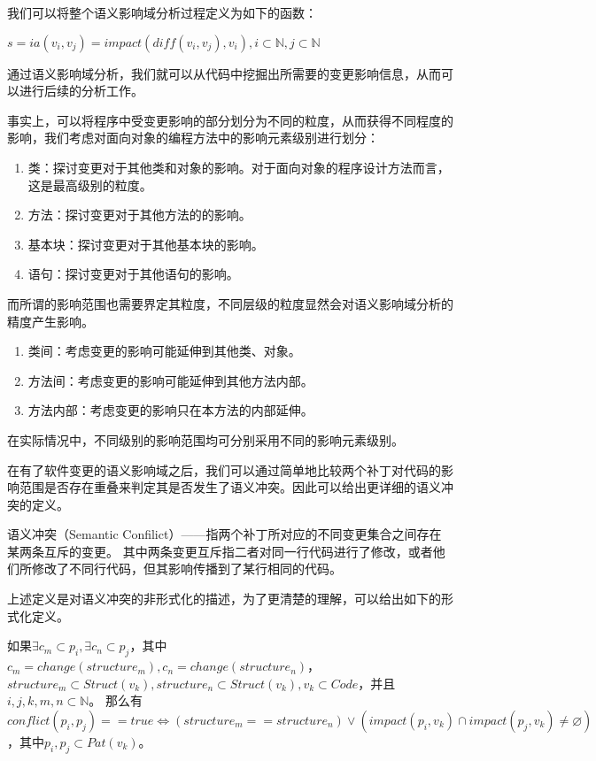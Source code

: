 我们可以将整个语义影响域分析过程定义为如下的函数：

\begin{definition}
	$s = ia(v_i,v_j) = impact(diff(v_i,v_j),v_i),i \subset \mathbb{N}, j \subset \mathbb{N}$
\end{definition}

通过语义影响域分析，我们就可以从代码中挖掘出所需要的变更影响信息，从而可以进行后续的分析工作。

事实上，可以将程序中受变更影响的部分划分为不同的粒度，从而获得不同程度的影响，我们考虑对面向对象的编程方法中的影响元素级别进行划分：

\begin{enumerate}
	\item 类：探讨变更对于其他类和对象的影响。对于面向对象的程序设计方法而言，这是最高级别的粒度。
	\item 方法：探讨变更对于其他方法的的影响。
	\item 基本块：探讨变更对于其他基本块的影响。
	\item 语句：探讨变更对于其他语句的影响。
\end{enumerate}

而所谓的影响范围也需要界定其粒度，不同层级的粒度显然会对语义影响域分析的精度产生影响。

\begin{enumerate}
	\item 类间：考虑变更的影响可能延伸到其他类、对象。
	\item 方法间：考虑变更的影响可能延伸到其他方法内部。
	\item 方法内部：考虑变更的影响只在本方法的内部延伸。
\end{enumerate}

在实际情况中，不同级别的影响范围均可分别采用不同的影响元素级别。

在有了软件变更的语义影响域之后，我们可以通过简单地比较两个补丁对代码的影响范围是否存在重叠来判定其是否发生了语义冲突。因此可以给出更详细的语义冲突的定义。

\begin{definition}
	\label {define_conflict}
	语义冲突（Semantic Confilict）——指两个补丁所对应的不同变更集合之间存在某两条互斥的变更。
	其中两条变更互斥指二者对同一行代码进行了修改，或者他们所修改了不同行代码，但其影响传播到了某行相同的代码。
\end{definition}

上述定义是对语义冲突的非形式化的描述，为了更清楚的理解，可以给出如下的形式化定义。

\begin{definition}
	\label {problem}
	如果$\exists c_m \subset p_i, \exists c_n \subset p_j$，其中$c_m = change(structure_m),c_n = change(structure_n)$， $structure_m \subset Struct(v_k), structure_n \subset Struct(v_k), v_k \subset Code$，并且$i,j,k,m,n \subset \mathbb{N}$。
	那么有$conflict(p_i,p_j) == true \iff (structure_m == structure_n) \lor (impact(p_i,v_k) \cap impact(p_j,v_k) \neq \varnothing)$，其中$p_i,p_j \subset Pat(v_k)$。
\end{definition}

